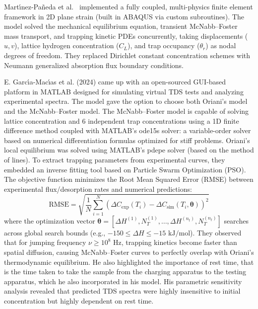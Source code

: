 \documentclass[a4paper,12pt,oneside]{report}
\begin{document}
Mart\'{\i}nez-Pa\~{n}eda et al.~\cite{MartinezPaneda2020} implemented a fully coupled, multi-physics finite element framework in 2D plane strain (built in ABAQUS via custom subroutines). The model solved the mechanical equilibrium equation, transient McNabb--Foster mass transport, and trapping kinetic PDEs concurrently, taking displacements ($u, v$), lattice hydrogen concentration ($C_L$), and trap occupancy ($\theta_r$) as nodal degrees of freedom. They replaced Dirichlet constant concentration schemes with Neumann generalized absorption flux boundary conditions.

E. Garc\'{\i}a-Mac\'{\i}as et al. (2024)\cite{garcia2024tds} came up with an open-sourced GUI-based platform in MATLAB designed for simulating virtual TDS tests and analyzing experimental spectra. The model gave the option to choose both Oriani's model and the McNabb--Foster model. The McNabb--Foster model is capable of solving lattice concentration and 6 independent trap concentrations using a 1D finite difference method coupled with MATLAB's ode15s solver: a variable-order solver based on numerical differentiation formulas optimized for stiff problems. Oriani's local equilibrium was solved using MATLAB's pdepe solver (based on the method of lines). To extract trapping parameters from experimental curves, they embedded an inverse fitting tool based on Particle Swarm Optimization (PSO). The objective function minimizes the Root Mean Squared Error (RMSE) between experimental flux/desorption rates and numerical predictions:
\begin{equation}
    \text{RMSE} = \sqrt{\frac{1}{N} \sum_{i=1}^{N} \left( \Delta C_{\text{exp}}(T_i) - \Delta C_{\text{sim}}(T_i, \boldsymbol{\theta}) \right)^2}
\end{equation}
where the optimization vector $\boldsymbol{\theta} = [\Delta H^{(1)}, N_T^{(1)}, \dots, \Delta H^{(n_t)}, N_T^{(n_t)}]$ searches across global search bounds (e.g., $-150 \le \Delta H \le -15 \text{ kJ/mol}$). They observed that for jumping frequency $\nu \ge 10^8\text{ Hz}$, trapping kinetics become faster than spatial diffusion, causing McNabb--Foster curves to perfectly overlap with Oriani's thermodynamic equilibrium. He also highlighted the importance of rest time, that is the time taken to take the sample from the charging apparatus to the testing apparatus, which he also incorporated in his model. His parametric sensitivity analysis revealed that predicted TDS spectra were highly insensitive to initial concentration but highly dependent on rest time.
\end{document}
